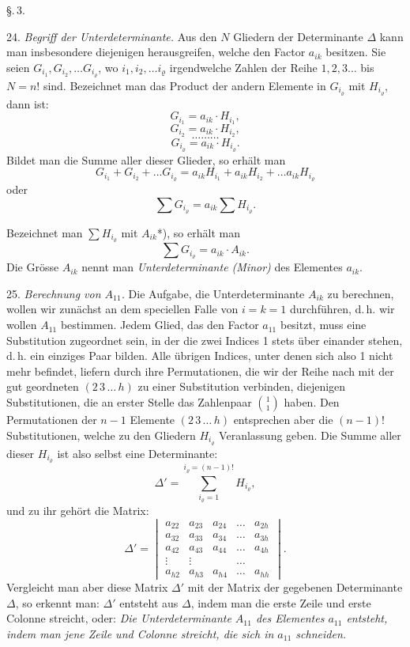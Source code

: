 \documentclass[11pt]{article}
\providecommand{\gesperrt}[1]{\textls[130]{#1}}
\providecommand{\weberpage}[1]{}
\let\Delta\varDelta
\begin{document}
\begin{center}
\S.\,3.\\
\gesperrt{Unterdeterminanten erster Ordnung.}
\end{center}

24. \textit{Begriff der Unterdeterminante.} Aus den $N$ Gliedern der
Determinante $\Delta$ kann man insbesondere diejenigen herausgreifen, welche
den Factor $a_{ik}$ besitzen. Sie seien $G_{i_1}, G_{i_2}, \dots G_{i_\varrho}$,
wo $i_1, i_2, \dots i_\varrho$ irgendwelche Zahlen der Reihe $1, 2, 3 \dots$
bis $N = n!$ sind. Bezeichnet man das Product der andern Elemente in
$G_{i_\varrho}$ mit $H_{i_\varrho}$, dann ist:
\[
G_{i_1} = a_{ik} \cdot H_{i_1},
\]
\[
G_{i_2} = a_{ik} \cdot H_{i_2},
\]
\[
\dots\dots\dots
\]
\[
G_{i_\varrho} = a_{ik} \cdot H_{i_\varrho}.
\]
Bildet man die Summe aller dieser Glieder, so erh\"alt man
\[
G_{i_1} + G_{i_2} + \dots G_{i_\varrho} = a_{ik} H_{i_1} + a_{ik} H_{i_2} +
\dots a_{ik} H_{i_\varrho}
\]
oder
\[
\sum G_{i_\varrho} = a_{ik} \sum H_{i_\varrho}.
\]


\weberpage{32}
Bezeichnet man $\sum H_{i_\varrho}$ mit $A_{ik}$*), so erh\"alt man
\[
\sum G_{i_\varrho} = a_{ik} \cdot A_{ik}.
\]
Die Gr\"osse $A_{ik}$ nennt man \textit{Unterdeterminante (Minor)} des
Elementes $a_{ik}$.

25. \textit{Berechnung von $A_{11}$.} Die Aufgabe, die Unterdeterminante
$A_{ik}$ zu berechnen, wollen wir zun\"achst an dem speciellen Falle von
$i = k = 1$ durchf\"uhren, d.\,h. wir wollen $A_{11}$ bestimmen. Jedem Glied,
das den Factor $a_{11}$ besitzt, muss eine Substitution zugeordnet sein, in
der die zwei Indices 1 stets \"uber einander stehen, d.\,h. ein einziges Paar
bilden. Alle \"ubrigen Indices, unter denen sich also 1 nicht mehr befindet,
liefern durch ihre Permutationen, die wir der Reihe nach mit der gut
geordneten $(2\,3\,\dots\,h)$ zu einer Substitution verbinden, diejenigen
Substitutionen, die an erster Stelle das Zahlenpaar $\binom{1}{1}$ haben. Den
Permutationen der $n-1$ Elemente $(2\,3\,\dots\,h)$ entsprechen aber die
$(n-1)!$ Substitutionen, welche zu den Gliedern $H_{i_\varrho}$ Veranlassung
geben. Die Summe aller dieser $H_{i_\varrho}$ ist also selbst eine
Determinante:
\[
\Delta' = \sum_{i_\varrho = 1}^{i_\varrho = (n-1)!} H_{i_\varrho},
\]
und zu ihr geh\"ort die Matrix:
\[
\Delta' =
\begin{vmatrix}
a_{22} & a_{23} & a_{24} & \dots & a_{2h} \\
a_{32} & a_{33} & a_{34} & \dots & a_{3h} \\
a_{42} & a_{43} & a_{44} & \dots & a_{4h} \\
\vdots & \vdots & & \dots & \\
a_{h2} & a_{h3} & a_{h4} & \dots & a_{hh}
\end{vmatrix}.
\]
Vergleicht man aber diese Matrix $\Delta'$ mit der Matrix der gegebenen
Determinante $\Delta$, so erkennt man: $\Delta'$ entsteht aus $\Delta$, indem
man die erste Zeile und erste Colonne streicht, oder: \textit{Die
Unterdeterminante $A_{11}$ des Elementes $a_{11}$ entsteht, indem man jene
Zeile und Colonne streicht, die sich in $a_{11}$ schneiden.}
\end{document}
